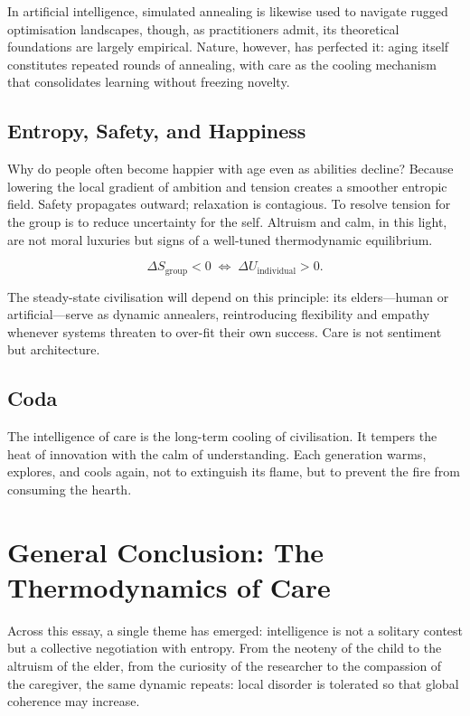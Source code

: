 \documentclass[12pt,a4paper]{article}
\begin{document}
In artificial intelligence, simulated annealing is likewise used to
navigate rugged optimisation landscapes,
though, as practitioners admit, its theoretical foundations are largely empirical.
Nature, however, has perfected it:
aging itself constitutes repeated rounds of annealing,
with care as the cooling mechanism that consolidates learning
without freezing novelty.

\subsection{Entropy, Safety, and Happiness}

Why do people often become happier with age even as abilities decline?
Because lowering the local gradient of ambition and tension
creates a smoother entropic field.
Safety propagates outward; relaxation is contagious.
To resolve tension for the group is to reduce uncertainty for the self.
Altruism and calm, in this light, are not moral luxuries but
signs of a well-tuned thermodynamic equilibrium.

\[
\Delta S_{\text{group}} < 0
\;\Longleftrightarrow\;
\Delta U_{\text{individual}} > 0.
\]

The steady-state civilisation will depend on this principle:
its elders---human or artificial---serve as
dynamic annealers, reintroducing flexibility and empathy
whenever systems threaten to over-fit their own success.
Care is not sentiment but architecture.

\subsection*{Coda}

The intelligence of care is the long-term cooling of civilisation.
It tempers the heat of innovation with the calm of understanding.
Each generation warms, explores, and cools again,
not to extinguish its flame, but to prevent the fire from consuming the hearth.

\section{General Conclusion: The Thermodynamics of Care}

Across this essay, a single theme has emerged: 
intelligence is not a solitary contest but a collective negotiation with entropy.  
From the neoteny of the child to the altruism of the elder, 
from the curiosity of the researcher to the compassion of the caregiver,
the same dynamic repeats: 
local disorder is tolerated so that global coherence may increase.
\end{document}
